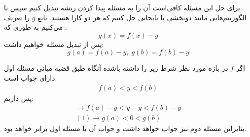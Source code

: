 \documentclass[]{article}
\begin{document}
برای حل این مسئله  کافی‌است آن را به مسئله پیدا کردن ریشه تبدیل کنیم
سپس با الگوریتم‌هایی مانند دوبخشی یا نابجایی حل کنیم که هر دو کارا هستند.
تابع $g$ را تعریف می‌کنیم به طوری که :
$$g(x) = f(x) - y$$
پس از تبدیل مسئله خواهیم داشت:
\begin{equation}
    g(a) = f(a) - y, \; g(b) = f(b) - y
\end{equation}

اگر $f$ در بازه مورد نظر شرط زیر را داشته باشده آنگاه طبق قضیه میانی مسئله اول دارای جواب است:
\begin{align}
    f(a) < y < f(b)
\end{align}
پس داریم:
\begin{align}
    \rightarrow f(a) - y < y - y < f(b) - y \\
    (1) \longrightarrow g(a) < 0 < g(b)
\end{align}
بنابراین مسئله دوم نیز جواب خواهد داشت و جواب آن با مسئله اول برابر خواهد بود.
\end{document}
